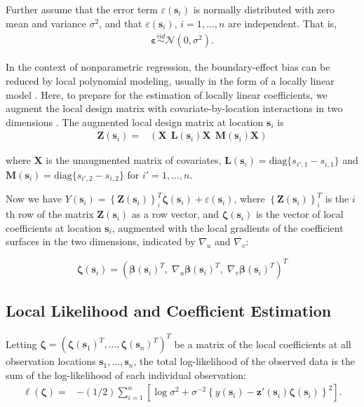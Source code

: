 \documentclass[english]{article}\usepackage[]{graphicx}\usepackage[]{color}
\theoremstyle{plain}
\theoremstyle{plain}
\begin{document}
Further assume that the error term $\varepsilon(\bm{s}_{i})$ is normally
distributed with zero mean and variance $\sigma^{2}$, and that $\varepsilon(\bm{s}_{i})$,
$i=1,\dots,n$ are independent. That is, 
\begin{align}
\bm{\varepsilon}\overset{iid}{\sim}\mathcal{N}\left(0,\sigma^{2}\right).\label{eq:err}
\end{align}


In the context of nonparametric regression, the boundary-effect bias
can be reduced by local polynomial modeling, usually in the form of
a locally linear model \citep{Fan-Gijbels-1996}. Here, to prepare
for the estimation of locally linear coefficients, we augment the
local design matrix with covariate-by-location interactions in two
dimensions \citep{Wang-2008b}. The augmented local design matrix
at location $\bm{s}_{i}$ is 
\begin{align}
\bm{Z}(\bm{s}_{i})= & \left(\bm{X}\:\:\bm{L}\left(\bm{s}_{i}\right)\bm{X}\:\:\bm{M}\left(\bm{s}_{i}\right)\bm{X}\right)\label{eq:augmented-covariates}
\end{align}


where $\bm{X}$ is the unaugmented matrix of covariates, $\bm{L}\left(\bm{s}_{i}\right)=\text{diag}\{s_{i',1}-s_{i,1}\}$
and $\bm{M}\left(\bm{s}_{i}\right)=\text{diag}\{s_{i',2}-s_{i,2}\}$
for $i'=1,\dots,n$.

Now we have $Y(\bm{s}_{i})=\left\{ \bm{Z}(\bm{s}_{i})\right\} _{i}^{T}\bm{\zeta}(\bm{s}_{i})+\varepsilon(\bm{s}_{i})$,
where $\left\{ \bm{Z}(\bm{s}_{i})\right\} _{i}^{T}$ is the $i$th
row of the matrix $\bm{Z}(\bm{s}_{i})$ as a row vector, and $\bm{\zeta}(\bm{s}_{i})$
is the vector of local coefficients at location $\bm{s}_{i}$, augmented
with the local gradients of the coefficient surfaces in the two dimensions,
indicated by $\nabla_{u}$ and $\nabla_{v}$:

\begin{equation}
\bm{\zeta}(\bm{s}_{i})=\left(\bm{\beta}(\bm{s}_{i})^{T},\;\nabla_{u}\bm{\beta}(\bm{s}_{i})^{T},\;\nabla_{v}\bm{\beta}(\bm{s}_{i})^{T}\right)^{T}\label{eq:augmented-coefficients}
\end{equation}



\subsection{Local Likelihood and Coefficient Estimation}

Letting $\bm{\zeta}=\left(\bm{\zeta}\left(\bm{s}_{1}\right)^{T},\dots,\bm{\zeta}\left(\bm{s}_{n}\right)^{T}\right)^{T}$
be a matrix of the local coefficients at all observation locations
$\bm{s}_{1},\dots,\bm{s}_{n}$, the total log-likelihood of the observed
data is the sum of the log-likelihood of each individual observation:
\begin{align}
\ell\left(\bm{\zeta}\right)= & -(1/2)\sum_{i=1}^{n}\left[\log{\sigma^{2}}+\sigma^{-2}\left\{ y(\bm{s}_{i})-\bm{z}'(\bm{s}_{i})\bm{\zeta}(\bm{s}_{i})\right\} ^{2}\right].\label{eq:coefficients}
\end{align}
\end{document}
